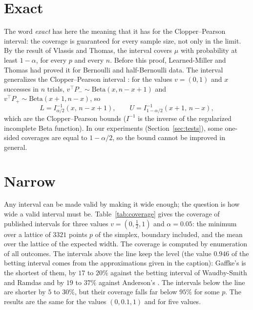 \documentclass[11pt]{article}
\newcommand{\Beta}{\mathrm{Beta}}
\begin{document}
\section{Exact}\label{sec:exact}

The word \emph{exact} has here the meaning that it has for the Clopper--Pearson interval: the coverage is guaranteed for every sample size, not only in the limit.
By the result of Vlassis and Thomas, the interval covers $\mu$ with probability at least $1 - \alpha$, for every $p$ and every $n$.
Before this proof, Learned-Miller and Thomas \cite{lmt2019} had proved it for Bernoulli and half-Bernoulli data.
The interval generalizes the Clopper--Pearson interval \cite{clopper1934}: for the values $v = (0, 1)$ and $x$ successes in $n$ trials, $v^\top P_- \sim \Beta(x, n - x + 1)$ and $v^\top P_+ \sim \Beta(x + 1, n - x)$, so
\[
  L = I^{-1}_{\alpha/2}(x,\, n - x + 1), \qquad U = I^{-1}_{1 - \alpha/2}(x + 1,\, n - x),
\]
which are the Clopper--Pearson bounds ($I^{-1}$ is the inverse of the regularized incomplete Beta function).
In our experiments (Section~\ref{sec:tests}), some one-sided coverages are equal to $1 - \alpha/2$, so the bound cannot be improved in general.

\section{Narrow}\label{sec:narrow}

Any interval can be made valid by making it wide enough; the question is how wide a valid interval must be.
Table~\ref{tab:coverage} gives the coverage of published intervals for three values $v = (0, \frac12, 1)$ and $\alpha = 0.05$: the minimum over a lattice of $3321$ points $p$ of the simplex, boundary included, and the mean over the lattice of the expected width.
The coverage is computed by enumeration of all outcomes.
The intervals above the line keep the level (the value $0.946$ of the betting interval comes from the approximations given in the caption): Gaffke's is the shortest of them, by $17$ to $20\%$ against the betting interval of Waudby-Smith and Ramdas \cite{wsr2024} and by $19$ to $37\%$ against Anderson's \cite{anderson1969}.
The intervals below the line are shorter by $5$ to $30\%$, but their coverage falls far below $95\%$ for some $p$.
The results are the same for the values $(0, 0.1, 1)$ and for five values.
\end{document}
